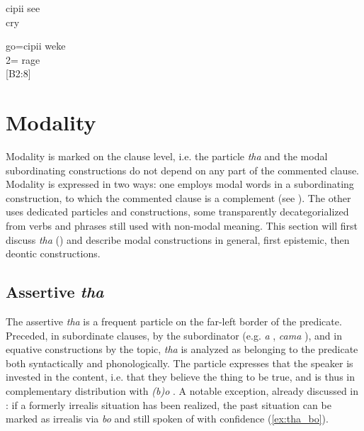 
 \ea\label{ex:cipii}
	\gll cipii see\\
	  cry\\
	\glt {}
	 \z
	
	\ea\label{ex:prohPN}
	\gll go=cipii weke\\
	 2= rage\\
	\glt {} {[B2:8]}
		\z 



\section{Modality}
\label{sec:Modality}
Modality is marked on the clause level, i.e. the particle \textit{tha} and the modal subordinating constructions do not depend on any part of the commented clause.
Modality is expressed in two ways: one employs modal words in a subordinating construction, to which the commented clause is a complement (see ). The other uses dedicated particles and constructions, some transparently decategorialized from verbs and phrases still used with non-modal meaning. This section will first discuss \textit{tha} () and describe modal constructions in general, first epistemic, then deontic constructions.

\subsection{Assertive \textit{tha}}
\label{sec:ass}
The assertive \textit{tha} is a frequent particle on the far-left border of the predicate. Preceded, in subordinate clauses, by the subordinator (e.g. \textit{a} , \textit{cama} ), and in equative constructions by the topic, \textit{tha} is analyzed as belonging to the predicate both syntactically and phonologically. The particle expresses that the speaker is invested in the content, i.e. that they believe the thing to be true, and is thus in complementary distribution with \textit{(b)o} . A notable exception, already discussed in : if a formerly irrealis situation has been realized, the past situation can be marked as irrealis via \textit{bo} and still spoken of with confidence (\ref{ex:tha_bo}). %

